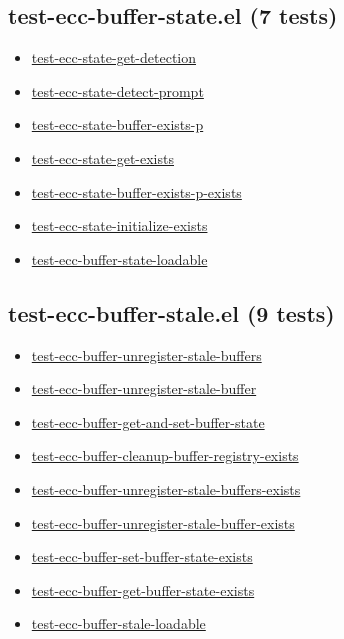 \documentclass[11pt]{article}
\begin{document}
\subsection{test-ecc-buffer-state.el (7 tests)}
\label{sec:org5e32d00}
\begin{itemize}
\item \href{test-ecc-buffer-state.el}{test-ecc-state-get-detection}
\item \href{test-ecc-buffer-state.el}{test-ecc-state-detect-prompt}
\item \href{test-ecc-buffer-state.el}{test-ecc-state-buffer-exists-p}
\item \href{test-ecc-buffer-state.el}{test-ecc-state-get-exists}
\item \href{test-ecc-buffer-state.el}{test-ecc-state-buffer-exists-p-exists}
\item \href{test-ecc-buffer-state.el}{test-ecc-state-initialize-exists}
\item \href{test-ecc-buffer-state.el}{test-ecc-buffer-state-loadable}
\end{itemize}
\subsection{test-ecc-buffer-stale.el (9 tests)}
\label{sec:orge256ccb}
\begin{itemize}
\item \href{test-ecc-buffer-stale.el}{test-ecc-buffer-unregister-stale-buffers}
\item \href{test-ecc-buffer-stale.el}{test-ecc-buffer-unregister-stale-buffer}
\item \href{test-ecc-buffer-stale.el}{test-ecc-buffer-get-and-set-buffer-state}
\item \href{test-ecc-buffer-stale.el}{test-ecc-buffer-cleanup-buffer-registry-exists}
\item \href{test-ecc-buffer-stale.el}{test-ecc-buffer-unregister-stale-buffers-exists}
\item \href{test-ecc-buffer-stale.el}{test-ecc-buffer-unregister-stale-buffer-exists}
\item \href{test-ecc-buffer-stale.el}{test-ecc-buffer-set-buffer-state-exists}
\item \href{test-ecc-buffer-stale.el}{test-ecc-buffer-get-buffer-state-exists}
\item \href{test-ecc-buffer-stale.el}{test-ecc-buffer-stale-loadable}
\end{itemize}
\end{document}
